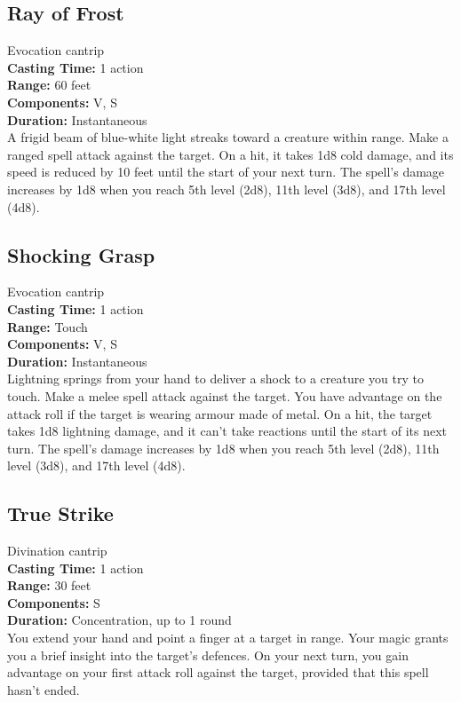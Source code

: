 \documentclass[11pt, A4paper, english]{article}
\begin{document}
		\subsection{Ray of Frost}
Evocation cantrip \\
\textbf{Casting Time:} 1 action \\
\textbf{Range:} 60 feet \\
\textbf{Components:} V, S \\
\textbf{Duration:} Instantaneous \\
A frigid beam of blue-white light streaks toward a creature within range. Make a ranged spell attack against the target. On a hit, it takes 1d8 cold damage, and its speed is reduced by 10 feet until the start of your next turn. The spell’s damage increases by 1d8 when you reach 5th level (2d8), 11th level (3d8), and 17th level (4d8).

		\subsection{Shocking Grasp}
Evocation cantrip \\
\textbf{Casting Time:} 1 action \\
\textbf{Range:} Touch \\
\textbf{Components:} V, S \\
\textbf{Duration:} Instantaneous \\
Lightning springs from your hand to deliver a shock to a creature you try to touch. Make a melee spell attack against the target. You have advantage on the attack roll if the target is wearing armour made of metal. On a hit, the target takes  1d8 lightning damage, and it can’t take reactions until the start of its next turn. The spell's damage increases by 1d8 when you reach 5th level (2d8), 11th level (3d8), and 17th level (4d8).

		\subsection{True Strike}
Divination cantrip \\
\textbf{Casting Time:} 1 action \\
\textbf{Range:} 30 feet \\
\textbf{Components:} S \\
\textbf{Duration:} Concentration, up to 1 round \\
You extend your hand and point a finger at a target in range. Your magic grants you a brief insight into the target's defences. On your next turn, you gain advantage on your first attack roll against the target, provided that this spell hasn't ended.
\end{document}
